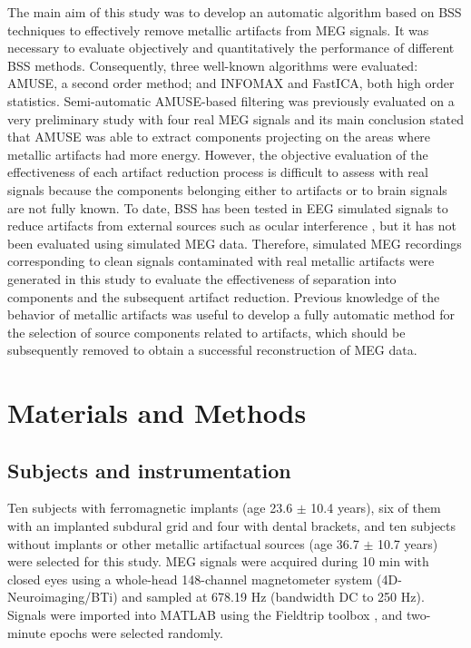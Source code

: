 The main aim of this study was to develop an automatic algorithm based on BSS techniques to effectively remove metallic artifacts from MEG signals. It was necessary to evaluate objectively and quantitatively the performance of different BSS methods. Consequently, three well-known algorithms were evaluated: AMUSE, a second order method; and INFOMAX and FastICA, both high order statistics. Semi-automatic AMUSE-based filtering was previously evaluated on a very preliminary study with four real MEG signals \citep{Migliorelli2013} and its main conclusion stated that AMUSE was able to extract components projecting on the areas where metallic artifacts had more energy. However, the objective evaluation of the effectiveness of each artifact reduction process is difficult to assess with real signals because the components belonging either to artifacts or to brain signals are not fully known. To date, BSS has been tested in EEG simulated signals to reduce artifacts from external sources such as ocular interference \citep{Romero2008,Romero2009},  but it has not been evaluated using simulated MEG data. Therefore, simulated MEG recordings corresponding to clean signals contaminated with real metallic artifacts were generated in this study to evaluate the effectiveness of separation into components and the subsequent artifact reduction. Previous knowledge of the behavior of metallic artifacts was useful to develop a fully automatic method for the selection of source components related to artifacts, which should be subsequently removed to obtain a successful reconstruction of MEG data. \\
\clearpage

\section{Materials and Methods}

\subsection*{Subjects and instrumentation}

Ten subjects with ferromagnetic implants (age 23.6 $\pm$ 10.4 years), six of them with an implanted subdural grid and four with dental brackets, and ten subjects without implants or other metallic artifactual sources (age 36.7 $\pm$ 10.7 years) were selected for this study. MEG signals were acquired during 10 min with closed eyes using a whole-head 148-channel magnetometer system (4D-Neuroimaging/BTi) and sampled at 678.19 Hz (bandwidth DC to 250 Hz). Signals were imported into MATLAB using the Fieldtrip toolbox \citep{Oostenveld2011}, and two-minute epochs were selected randomly.

